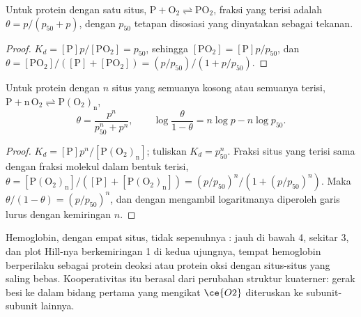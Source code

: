 \begin{proposition}\label{prop:b3:bioinorganic:hyperbola}
Untuk protein dengan satu situs, $\mathrm{P + O_2 \rightleftharpoons PO_2}$, fraksi yang terisi adalah $\theta = p/(p_{50} + p)$, dengan $p_{50}$
tetapan disosiasi yang dinyatakan sebagai tekanan.
\end{proposition}

\begin{proof}
$K_d = [\mathrm P]p/[\mathrm{PO_2}] = p_{50}$, sehingga $[\mathrm{PO_2}] = [\mathrm P]p/p_{50}$, dan $\theta = [\mathrm{PO_2}]/([\mathrm P] + [\mathrm{PO_2}]) = (p/p_{50})/(1 + p/p_{50})$.
\end{proof}

\begin{theorem}\label{thm:b3:bioinorganic:hill}
Untuk protein dengan $n$ situs yang semuanya kosong atau semuanya terisi,
$\mathrm{P + n\,O_2 \rightleftharpoons P(O_2)_n}$,
\[
  \theta = \frac{p^n}{p_{50}^n + p^n}, \qquad \log\frac{\theta}{1 - \theta} = n\log p - n\log p_{50}.
\]
\end{theorem}

\begin{proof}
$K_d = [\mathrm P]p^n/[\mathrm{P(O_2)_n}]$; tuliskan $K_d = p_{50}^n$. Fraksi situs yang terisi sama dengan fraksi molekul
dalam bentuk terisi, $\theta = [\mathrm{P(O_2)_n}]/([\mathrm P] + [\mathrm{P(O_2)_n}]) = (p/p_{50})^n/(1 + (p/p_{50})^n)$. Maka $\theta/(1 - \theta) = (p/p_{50})^n$, dan dengan mengambil
logaritmanya diperoleh garis lurus dengan kemiringan $n$.
\end{proof}

Hemoglobin, dengan empat situs, tidak sepenuhnya : 
jauh di bawah 4, sekitar 3, dan plot Hill-nya berkemiringan 1 di kedua ujungnya, tempat
hemoglobin berperilaku sebagai protein deoksi atau protein oksi dengan situs-situs yang saling bebas.
Kooperativitas itu berasal dari perubahan struktur kuaterner: gerak
besi ke dalam bidang  pertama yang mengikat $\ce{O2}$ diteruskan ke subunit-subunit lainnya.


